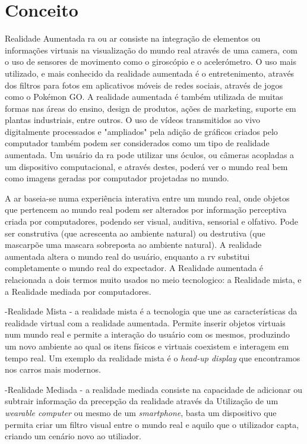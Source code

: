 \documentclass{report}
\begin{document}
\section{Conceito}
Realidade Aumentada \ac{ra} ou \ac{ar} consiste na integração de elementos ou informações virtuais na visualização do mundo real através de uma camera, com o uso de sensores de movimento como o giroscópio e o acelerómetro. O uso mais utilizado, e mais conhecido da realidade aumentada é o entretenimento, através dos filtros para fotos em aplicativos móveis de redes sociais, através de jogos como o Pokémon GO. A realidade aumentada é também utilizada de muitas formas nas áreas do ensino, design de produtos, ações de marketing, suporte em plantas industriais, entre outros. O uso de vídeos transmitidos ao vivo digitalmente processados e "ampliados" pela adição de gráficos criados pelo computador também podem ser considerados como um tipo de realidade aumentada. Um usuário da \ac{ra} pode utilizar uns óculos, ou câmeras acopladas a um dispositivo computacional, e através destes, poderá ver o mundo real bem como imagens geradas por computador projetadas no mundo.

A \ac{ar} baseia-se numa experiência interativa entre um mundo real, onde objetos que pertencem ao mundo real podem ser alterados por informação perceptiva criada por computadores, podendo ser visual, auditiva, sensorial e olfativo. Pode ser construtiva (que acrescenta ao ambiente natural) ou destrutiva (que mascarpõe uma mascara sobreposta ao ambiente natural). A realidade aumentada altera o mundo real do usuário, enquanto a \ac{rv} substitui completamente o mundo real do expectador. A Realidade aumentada é relacionada a dois termos muito usados no meio tecnologico: a Realidade mista, e a Realidade mediada por computadores. 

-Realidade Mista - a realidade mista é a tecnologia que une as características da realidade virtual com a realidade aumentada. Permite inserir objetos virtuais num mundo real e permite a interação do usuário com os mesmos, produzindo um novo ambiente ao qual os itens físicos e virtuais coexistem e interagem em tempo real. Um exemplo da realidade mista é o \textit{head-up display} que encontramos nos carros mais modernos.

-Realidade Mediada - a realidade mediada consiste na capacidade de adicionar ou subtrair informação da precepção da realidade através da Utilização de um \textit{wearable computer} ou mesmo de um \textit{smartphone}, basta um dispositivo que permita criar um filtro visual entre o mundo real e aquilo que o utilizador capta, criando um cenário novo ao utiliador.
\end{document}
